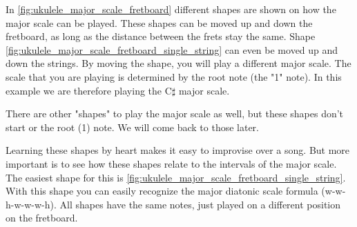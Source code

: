 \newpage

In \autoref{fig:ukulele_major_scale_fretboard} different shapes are shown on how the major scale can be played. These shapes can be moved up and down the fretboard, as long as the distance between the frets stay the same. Shape \autoref{fig:ukulele_major_scale_fretboard_single_string} can even be moved up and down the strings. By moving the shape, you will play a different major scale. The scale that you are playing is determined by the root note (the "1" note). In this example we are therefore playing the C$\sharp$ major scale.

There are other "shapes" to play the major scale as well, but these shapes don't start or the root (1) note. We will come back to those later.

Learning these shapes by heart makes it easy to improvise over a song. But more important is to see how these shapes relate to the intervals of the major scale. The easiest shape for this is \autoref{fig:ukulele_major_scale_fretboard_single_string}. With this shape you can easily recognize the major diatonic scale formula (w-w-h-w-w-w-h). All shapes have the same notes, just played on a different position on the fretboard.

